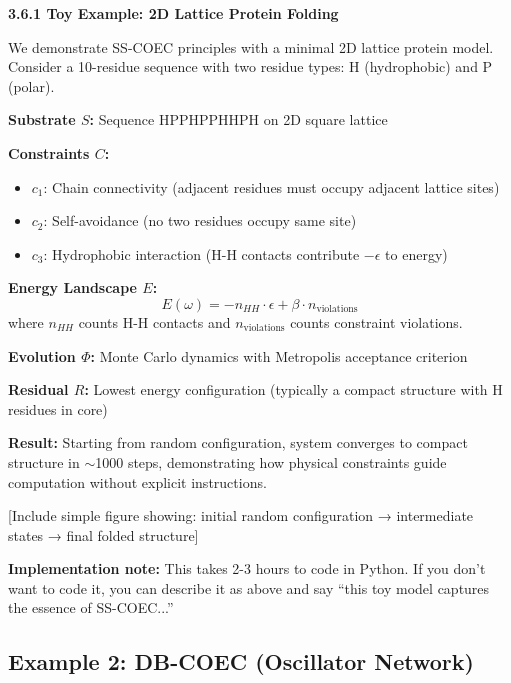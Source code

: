 \documentclass[11pt]{article}
\begin{document}
\begin{tcolorbox}[colback=add!10,colframe=add]
\textbf{3.6.1 Toy Example: 2D Lattice Protein Folding}

We demonstrate SS-COEC principles with a minimal 2D lattice protein model. Consider a 10-residue sequence with two residue types: H (hydrophobic) and P (polar).

\textbf{Substrate $S$:} Sequence HPPHPPHHPH on 2D square lattice

\textbf{Constraints $C$:}
\begin{itemize}
    \item $c_1$: Chain connectivity (adjacent residues must occupy adjacent lattice sites)
    \item $c_2$: Self-avoidance (no two residues occupy same site)  
    \item $c_3$: Hydrophobic interaction (H-H contacts contribute $-\epsilon$ to energy)
\end{itemize}

\textbf{Energy Landscape $E$:}
$$E(\omega) = -n_{HH} \cdot \epsilon + \beta \cdot n_{\text{violations}}$$
where $n_{HH}$ counts H-H contacts and $n_{\text{violations}}$ counts constraint violations.

\textbf{Evolution $\Phi$:} Monte Carlo dynamics with Metropolis acceptance criterion

\textbf{Residual $R$:} Lowest energy configuration (typically a compact structure with H residues in core)

\textbf{Result:} Starting from random configuration, system converges to compact structure in $\sim$1000 steps, demonstrating how physical constraints guide computation without explicit instructions.

[Include simple figure showing: initial random configuration → intermediate states → final folded structure]
\end{tcolorbox}

\textbf{Implementation note:} This takes 2-3 hours to code in Python. If you don't want to code it, you can describe it as above and say ``this toy model captures the essence of SS-COEC...''

\subsection{Example 2: DB-COEC (Oscillator Network)}
\end{document}
